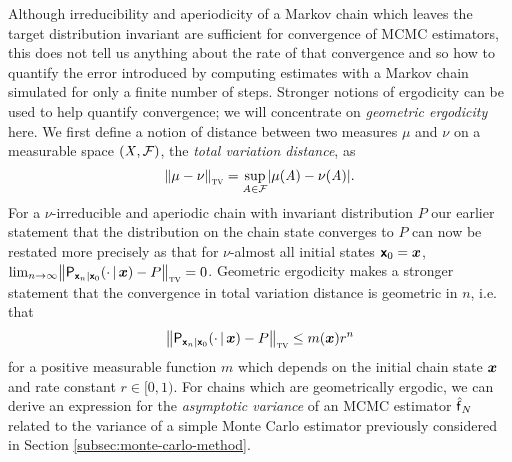 Although irreducibility and aperiodicity of a Markov chain which leaves the target distribution invariant are sufficient for convergence of \ac{MCMC} estimators, this does not tell us anything about the rate of that convergence and so how to quantify the error introduced by computing estimates with a Markov chain simulated for only a finite number of steps. Stronger notions of ergodicity can be used to help quantify convergence; we will concentrate on \emph{geometric ergodicity} here. We first define a notion of distance between two measures $\mu$ and $\nu$ on a measurable space $(\mathit{X},\mathcal{F})$, the \emph{total variation distance}, as
\begin{equation}\label{eq:total-variation-measures}
  \left\Vert \mu - \nu \right\Vert_{\textsc{tv}} = \sup_{\set{A} \in \sset{F}} \left| \mu(\set{A}) - \nu(\set{A}) \right|.
\end{equation}
For a $\nu$-irreducible and aperiodic chain with invariant distribution $P$ our earlier statement that the distribution on the chain state converges to $P$ can now be restated more precisely as that for $\nu$-almost all initial states $\boldsymbol{\mathsf{x}}_0 = \boldsymbol{x}$, $\lim_{n\to\infty} \left\Vert \prob{\rvct{x}_n|\rvct{x}_0}\lpa \cdot \gvn \vct{x}\rpa - \tgtprob \right\Vert_{\textsc{tv}} = 0$. Geometric ergodicity makes a stronger statement that the convergence in total variation distance is geometric in $n$, i.e. that
\begin{equation}\label{eq:geometric-ergodicity}
  \left\Vert \prob{\rvct{x}_n|\rvct{x}_0}\lpa \cdot \gvn \vct{x}\rpa - \tgtprob \right\Vert_{\textsc{tv}} \leq m(\vct{x}) r^n
\end{equation}
for a positive measurable function $m$ which depends on the initial chain state $\boldsymbol{x}$ and rate constant $r \in [0, 1)$. For chains which are geometrically ergodic, we can derive an expression for the \emph{asymptotic variance} of an \ac{MCMC} estimator $\hatf_N$ related to the variance of a simple Monte Carlo estimator previously considered in Section \ref{subsec:monte-carlo-method}.

